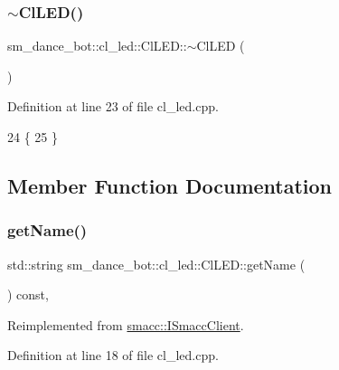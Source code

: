 \subsubsection{\texorpdfstring{$\sim$\+Cl\+L\+E\+D()}{~ClLED()}}
{\footnotesize\ttfamily sm\+\_\+dance\+\_\+bot\+::cl\+\_\+led\+::\+Cl\+L\+E\+D\+::$\sim$\+Cl\+L\+ED (\begin{DoxyParamCaption}{ }\end{DoxyParamCaption})\hspace{0.3cm}{\ttfamily [virtual]}}



Definition at line 23 of file cl\+\_\+led.\+cpp.


\begin{DoxyCode}
24 \{
25 \}
\end{DoxyCode}


\subsection{Member Function Documentation}
\mbox{\label{classsm__dance__bot_1_1cl__led_1_1ClLED_aa0a9fb92df96fb1bbba35c78fbe4119d}} 
\subsubsection{\texorpdfstring{get\+Name()}{getName()}}
{\footnotesize\ttfamily std\+::string sm\+\_\+dance\+\_\+bot\+::cl\+\_\+led\+::\+Cl\+L\+E\+D\+::get\+Name (\begin{DoxyParamCaption}{ }\end{DoxyParamCaption}) const\hspace{0.3cm}{\ttfamily [override]}, {\ttfamily [virtual]}}



Reimplemented from \hyperlink{classsmacc_1_1ISmaccClient_a8c3ce19f182e71909c5dc6263d25be69}{smacc\+::\+I\+Smacc\+Client}.



Definition at line 18 of file cl\+\_\+led.\+cpp.


